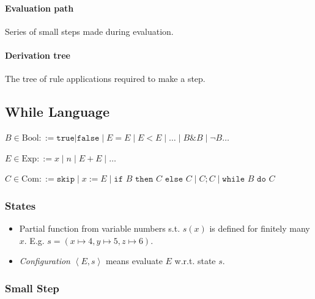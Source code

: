\documentclass[twocolumn,english]{article}
\begin{document}
\paragraph{Evaluation path}

Series of small steps made during evaluation.

\paragraph{Derivation tree}

The tree of rule applications required to make a step.

\subsection{While Language}

$B\in\text{Bool}::=\texttt{true}\lvert\texttt{false}\mid E=E\mid E<E\mid\dots\mid B\&B\mid\neg B\dots$

$E\in\text{Exp}::=x\mid n\mid E+E\mid\dots$

$C\in\text{Com}::=\texttt{skip}\mid x:=E\mid\texttt{if }B\texttt{ then }C\texttt{ else }C\mid C;C\mid\texttt{while }B\texttt{ do }C$

\subsubsection{States}
\begin{itemize}
\item Partial function from variable numbers s.t. $s(x)$ is defined for
finitely many $x$. E.g. $s=\left(x\mapsto4,y\mapsto5,z\mapsto6\right)$.
\item \emph{Configuration} $\left\langle E,s\right\rangle $ means evaluate
$E$ w.r.t. state $s$.
\end{itemize}

\subsubsection{Small Step}
\end{document}

